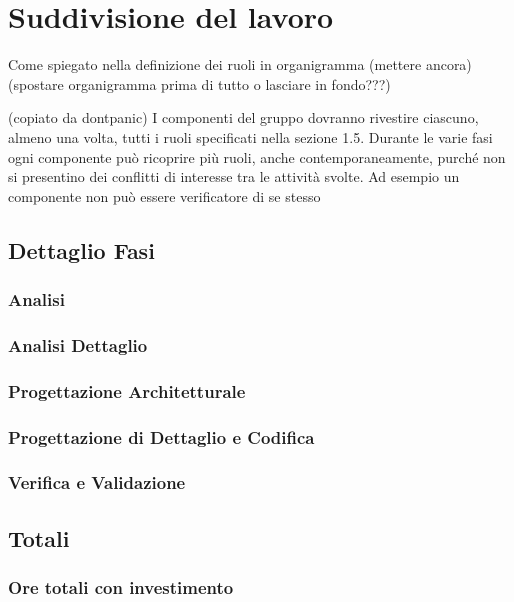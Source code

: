 \newpage
\section{Suddivisione del lavoro} \label{SuddivisioneDelLavoro}
	
	Come spiegato nella definizione dei ruoli in organigramma (mettere ancora) (spostare organigramma prima di tutto o lasciare in fondo???)

	(copiato da dontpanic)
	I componenti del gruppo dovranno rivestire ciascuno, almeno una volta, tutti i ruoli specificati nella sezione 1.5.
	Durante le varie fasi ogni componente può ricoprire più ruoli, anche contemporaneamente, purché non si presentino dei conflitti di interesse tra le attività svolte. Ad esempio un componente non può essere verificatore di se stesso

	\subsection{Dettaglio Fasi}
		\subsubsection{Analisi}
		\subsubsection{Analisi Dettaglio}
		\subsubsection{Progettazione Architetturale}
		\subsubsection{Progettazione di Dettaglio e Codifica}
		\subsubsection{Verifica e Validazione}

	\subsection{Totali}
		\subsubsection{Ore totali con investimento}	